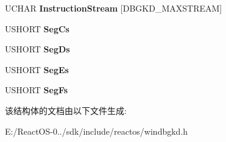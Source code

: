 \begin{DoxyCompactItemize}
U\+C\+H\+AR {\bfseries Instruction\+Stream} \mbox{[}D\+B\+G\+K\+D\+\_\+\+M\+A\+X\+S\+T\+R\+E\+AM\mbox{]}
\item 
\mbox{\label{struct___a_m_d64___d_b_g_k_d___c_o_n_t_r_o_l___r_e_p_o_r_t_a2aa9c43b79a6413027cb964415c1df51}} 
U\+S\+H\+O\+RT {\bfseries Seg\+Cs}
\item 
\mbox{\label{struct___a_m_d64___d_b_g_k_d___c_o_n_t_r_o_l___r_e_p_o_r_t_ac226bb0a401dce60ceeb711bbaf4b975}} 
U\+S\+H\+O\+RT {\bfseries Seg\+Ds}
\item 
\mbox{\label{struct___a_m_d64___d_b_g_k_d___c_o_n_t_r_o_l___r_e_p_o_r_t_a1b11a33a6e3696185c5669209497fb17}} 
U\+S\+H\+O\+RT {\bfseries Seg\+Es}
\item 
\mbox{\label{struct___a_m_d64___d_b_g_k_d___c_o_n_t_r_o_l___r_e_p_o_r_t_ae2fb42984ce8e56293471831a5bc5115}} 
U\+S\+H\+O\+RT {\bfseries Seg\+Fs}
\end{DoxyCompactItemize}


该结构体的文档由以下文件生成\+:\begin{DoxyCompactItemize}
\item 
E\+:/\+React\+O\+S-\/0../sdk/include/reactos/windbgkd.\+h\end{DoxyCompactItemize}
